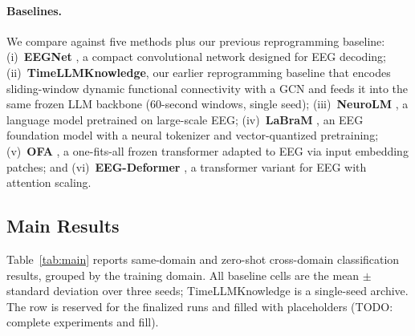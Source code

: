 \paragraph{Baselines.} We compare against five methods plus our previous
reprogramming baseline:
(i)~\textbf{EEGNet} , a compact convolutional network
designed for EEG decoding;
(ii)~\textbf{TimeLLMKnowledge}, our earlier reprogramming baseline that
encodes sliding-window dynamic functional connectivity with a GCN and feeds
it into the same frozen LLM backbone (60-second windows, single seed);
(iii)~\textbf{NeuroLM} , a language model pretrained on
large-scale EEG;
(iv)~\textbf{LaBraM} , an EEG foundation model with a
neural tokenizer and vector-quantized pretraining;
(v)~\textbf{OFA} , a one-fits-all frozen transformer adapted
to EEG via input embedding patches;
and (vi)~\textbf{EEG-Deformer} , a transformer
variant for EEG with attention scaling.

\subsection{Main Results}
\label{sec:exp-main}

Table~\ref{tab:main} reports same-domain and zero-shot cross-domain
classification results, grouped by the training domain. All baseline cells
are the mean $\pm$ standard deviation over three seeds; TimeLLMKnowledge is a
single-seed archive. The \modelname row is reserved for the finalized runs
and filled with placeholders (TODO: complete experiments and fill).



